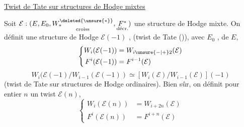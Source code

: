 \uline{Twist de Tate sur structures de Hodge mixtes}

Soit $\mathcal E:(E,E_0,\underset{\text{croiss}}{W_*^{\deleted{\unsure{*}}}},\underset{\text{décr.}}{F^*})$ une structure de Hodge mixte.
On définit une structure de Hodge $\mathcal E(-1)$ , (twist de Tate ()),  avec  $E_0$ , de  $E$,
\[
\left\{\begin{aligned}
W_i(\mathcal E(-1))&=W_{i\unsure{-|+}2}(\mathcal E)\\
F^i(\mathcal E(-1))&=F^{i-1}(\mathcal E)
\end{aligned}\right.
\]
\[
W_i(\mathcal E(-1)/W_{i-1}(\mathcal E(-1))\simeq[W_i(\mathcal E)/W_{i-1}(\mathcal E)](-1)
\]
(twist de Tate sur structures de Hodge ordinaires).
Bien sûr, on définit pour  entier $n$ un twist $\mathcal E(n)$,
\[
\left\{\begin{aligned}
W_i(\mathcal E(n))&=W_{i+2n}(\mathcal E)\\
F^i(\mathcal E(n))&=F^{i+n}(\mathcal E)
\end{aligned}\right.
\]

